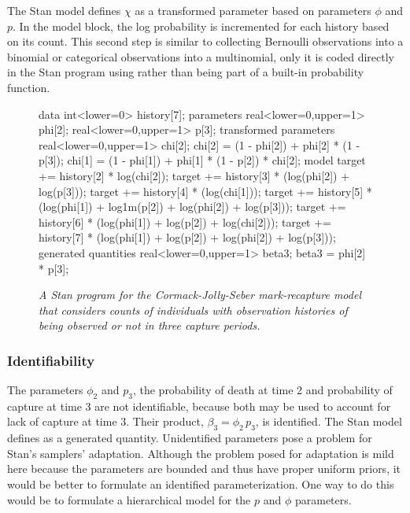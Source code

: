 The Stan model defines $\chi$ as a transformed parameter based on
parameters $\phi$ and $p$.  In the model block, the log probability is
incremented for each history based on its count.  This second step is
similar to collecting Bernoulli observations into a binomial or
categorical observations into a multinomial, only it is coded directly
in the Stan program using  rather than
being part of a built-in probability function.
%
\begin{figure}
\begin{stancode}
data {
  int<lower=0> history[7];
}
parameters {
  real<lower=0,upper=1> phi[2];
  real<lower=0,upper=1> p[3];
}
transformed parameters {
  real<lower=0,upper=1> chi[2];
  chi[2] = (1 - phi[2]) + phi[2] * (1 - p[3]);
  chi[1] = (1 - phi[1]) + phi[1] * (1 - p[2]) * chi[2];
}
model {
  target += history[2] * log(chi[2]);
  target += history[3] * (log(phi[2]) + log(p[3]));
  target += history[4] * (log(chi[1]));
  target += history[5] * (log(phi[1]) + log1m(p[2])
                            + log(phi[2]) + log(p[3]));
  target += history[6] * (log(phi[1]) + log(p[2])
                            + log(chi[2]));
  target += history[7] * (log(phi[1]) + log(p[2])
                            + log(phi[2]) + log(p[3]));
}
generated quantities {
  real<lower=0,upper=1> beta3;
  beta3 = phi[2] * p[3];
}
\end{stancode}
\vspace*{-12pt}
\caption{\small\it A Stan program for the Cormack-Jolly-Seber
  mark-recapture model that considers counts of individuals with
  observation histories of being observed or not in three capture
  periods.}\label{cjs-history.figure}
\end{figure}
%

\subsubsection{Identifiability}

The parameters $\phi_2$ and $p_3$, the probability of death at time 2
and probability of capture at time 3 are not identifiable, because both
may be used to account for lack of capture at time 3.  Their product,
$\beta_3 = \phi_2 \, p_3$, is identified.  The Stan model defines
 as a generated quantity.  Unidentified parameters pose a
problem for Stan's samplers' adaptation.  Although the problem posed
for adaptation is mild here because the parameters are bounded and
thus have proper uniform priors, it would be better to formulate an
identified parameterization.  One way to do this would be to formulate
a hierarchical model for the $p$ and $\phi$ parameters.

